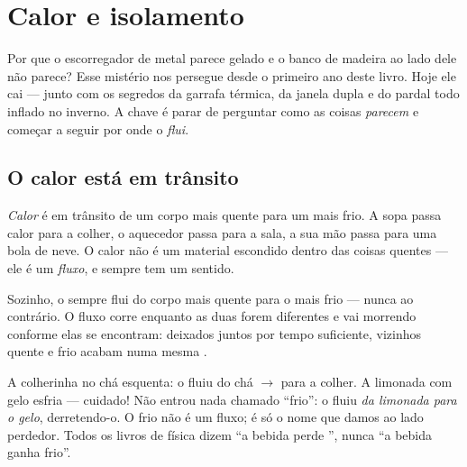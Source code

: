 \chapter{Calor e isolamento}\label{ch:g5:heat-and-insulation}

Por que o escorregador de metal parece gelado e o banco de madeira ao
lado dele não parece? Esse mistério nos persegue desde o primeiro ano
deste livro. Hoje ele cai --- junto com os segredos da garrafa
térmica, da janela dupla e do pardal todo inflado no inverno. A chave
é parar de perguntar como as coisas \emph{parecem} e começar a seguir
por onde o  \emph{flui}.

\section{O calor está em trânsito}

\begin{definition}[Calor]\label{def:g5:heat-and-insulation:heat}
\emph{Calor} é  em trânsito de um corpo mais
quente para um mais frio. A sopa passa calor para a colher, o
aquecedor passa para a sala, a sua mão passa para uma bola de neve. O
calor não é um material escondido dentro das coisas quentes --- ele é
um \emph{fluxo}, e sempre tem um sentido.
\end{definition}

\begin{proposition}\label{prop:g5:heat-and-insulation:downhill}
Sozinho, o  sempre flui do corpo mais quente para o mais frio
--- nunca ao contrário. O fluxo corre enquanto as duas 
forem diferentes e vai morrendo conforme elas se encontram: deixados
juntos por tempo suficiente, vizinhos quente e frio acabam numa mesma
.
\end{proposition}

\begin{example}\label{ex:g5:heat-and-insulation:direction}
A colherinha no chá esquenta: o  fluiu do chá $\to$ para a
colher. A limonada com gelo esfria --- cuidado! Não entrou nada
chamado ``frio'': o  fluiu \emph{da limonada para o gelo},
derretendo-o. O frio não é um fluxo; é só o nome que damos ao lado
perdedor. Todos os livros de física dizem ``a bebida perde '',
nunca ``a bebida ganha frio''.
\end{example}

